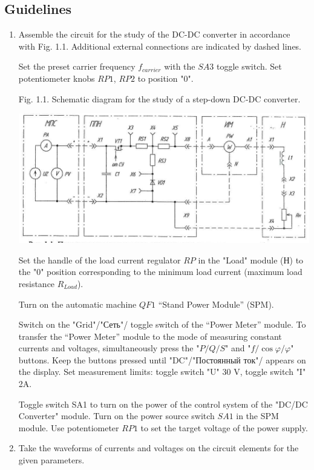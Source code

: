 \documentclass[a4paper,14pt]{article}
\begin{document}
\subsection{Guidelines}

\begin{enumerate}
\item Assemble the circuit for the study of the DC-DC converter in accordance with Fig. 1.1.
Additional external connections are indicated by dashed lines.

Set the preset carrier frequency $f_{carrier}$ with the $SA3$ toggle switch. Set potentiometer knobs $RP1$, $RP2$ to position "0".

Fig. 1.1. Schematic diagram for the study of a step-down DC-DC converter.

		\includegraphics[scale=1.8]{img_51}

Set the handle of the load current regulator $RP$ in the "Load" module (Н) to the "0" position 
	corresponding to the minimum load current (maximum load resistance $R_{Load}$).

Turn on the automatic machine $QF1$ “Stand Power Module” (SPM).

Switch on the "Grid"/"Сеть"/ toggle switch of the “Power Meter” module.
To transfer the “Power Meter” module to the mode of measuring constant currents and voltages, 
	simultaneously press the "$P/Q/S$" and "$f/\cos\varphi/\varphi$" buttons.
Keep the buttons pressed until "DC"/"Постоянный ток"/ appears on the display.
Set measurement limits: toggle switch "U" 30 V, toggle switch "I" 2A.

Toggle switch SA1 to turn on the power of the control system of the "DC/DC Converter" module.
Turn on the power source switch $SA1$ in the SPM module.
Use potentiometer $RP1$ to set the target voltage of the power supply.

\item Take the waveforms of currents and voltages on the circuit elements for the given parameters.


\end{enumerate}
\end{document}
